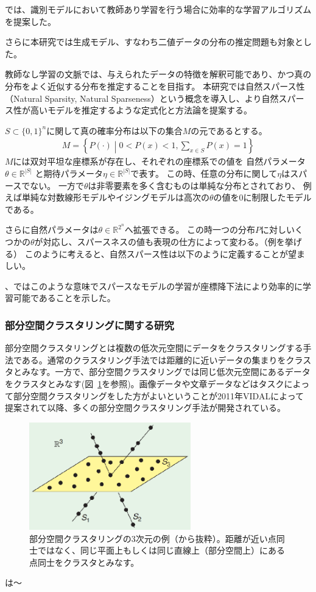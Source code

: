 \cite{LMY01}では、識別モデルにおいて教師あり学習を行う場合に効率的な学習アルゴリズムを提案した。


さらに本研究では生成モデル、すなわち二値データの分布の推定問題も対象とした。

教師なし学習の文脈では、与えられたデータの特徴を解釈可能であり、かつ真の分布をよく近似する分布を推定することを目指す。
本研究では自然スパース性（Natural Sparsity, Natural Sparseness）という概念を導入し、より自然スパース性が高いモデルを推定するような定式化と方法論を提案する。

$S\subset\{0,1\}^n$に関して真の確率分布は以下の集合$M$の元であるとする。
\begin{align*}
    M = \left\{ P(\cdot)\middle| 0<P(x)<1, \sum_{x\in S} P(x) = 1 \right\}
\end{align*}
$M$には双対平坦な座標系が存在し、それぞれの座標系での値を
自然パラメータ$\theta \in \mathbb{R}^{|S|}$
と期待パラメータ$\eta \in \mathbb{R}^{|S|}$で表す。
この時、任意の分布に関して$\eta$はスパースでない。
一方で$\theta$は非零要素を多く含むものは単純な分布とされており、
例えば単純な対数線形モデルやイジングモデルは高次の$\theta$の値を0に制限したモデルである。

さらに自然パラメータは$\theta \in \mathbb{R}^{2^n}$へ拡張できる。
この時一つの分布$P$に対しいくつかの$\theta$が対応し、スパースネスの値も表現の仕方によって変わる。（例を挙げる）
このように考えると、自然スパース性は以下のように定義することが望ましい。

\cite{HSM01}、\cite{HSM02}ではこのような意味でスパースなモデルの学習が座標降下法により効率的に学習可能であることを示した。


\subsubsection{部分空間クラスタリングに関する研究}

部分空間クラスタリングとは複数の低次元空間にデータをクラスタリングする手法である。通常のクラスタリング手法では距離的に近いデータの集まりをクラスタとみなす。一方で、部分空間クラスタリングでは同じ低次元空間にあるデータをクラスタとみなす(図~\ref{fig:my_label}を参照)。画像データや文章データなどはタスクによって部分空間クラスタリングをした方がよいということが2011年VIDAL\cite{SC}によって提案されて以降、多くの部分空間クラスタリング手法が開発されている。

\begin{figure}[h]
    \centering
    \includegraphics[width=7cm]{Matsushima/sc.eps}
    \caption{部分空間クラスタリングの3次元の例（\cite{SC}から抜粋）。距離が近い点同士ではなく、同じ平面上もしくは同じ直線上（部分空間上）にある点同士をクラスタとみなす。}
    \label{fig:my_label}
\end{figure}
\cite{NM01}は〜

